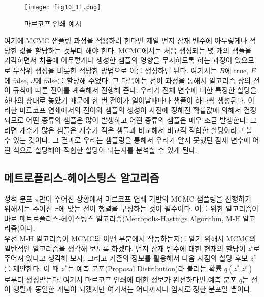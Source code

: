 \documentclass[a4paper]{oblivoir}
\begin{document}
\begin{figure}[ht] \centering 
\texttt{[image: fig10\_11.png]} 
\caption{마르코프 연쇄 예시}
\label{fig:10-11}
\end{figure}  

여기에 MCMC 샘플링 과정을 적용하려 한다면 제일 먼저 잠재 변수에 아무렇게나 적당한 값을 할당하는 것부터 해야 한다. MCMC에서는 처음 생성되는 몇 개의 샘플을 기각하면서 처음에 아무렇게나 생성한 샘플의 영향을 무시하도록 하는 과정이 있으므로 무작위 생성을 비롯한 적당한 방법으로 이를 생성하면 된다. 여기서는 $B$에 true, $E$에 false, $J$에 false를 할당해 주었다. 그 다음에는 전이 과정을 통해서 알고리즘 상의 전이 규칙에 따른 전이를 계속해서 진행해 준다. 우리가 전체 변수에 대한 특정한 할당을 하나의 상태로 놓았기 때문에 한 번 전이가 일어날때마다 샘플이 하나씩 생성된다. 이러한 마르코프 연쇄에서의 전이와 샘플의 생성이 사전에 정해진 확률값에 의해서 결정되므로 어떤 종류의 샘플은 많이 발생하고 어떤 종류의 샘플은 매우 조금 발생한다. 그러면 개수가 많은 샘플은 개수가 적은 샘플과 비교해서 비교적 적합한 할당이라고 볼 수 있는 것이다. 그 결과로 우리는 샘플링을 통해서 우리가 알지 못했던 잠재 변수에 어떤 식으로 할당해야 적합한 할당이 되는지를 분석할 수 있게 된다.\\

\subsection{메트로폴리스-헤이스팅스 알고리즘}

정적 분포 $\pi$만이 주어진 상황에서 마르코프 연쇄 기반의 MCMC 샘플링을 진행하기 위해서는 주어진 $\pi$에 맞는 전이 행렬을 구성하는 것이 필수이다. 이를 위한 알고리즘이 바로 메트로폴리스-헤이스팅스 알고리즘(Metropolis-Hastings Algorithm, M-H 알고리즘)이다. \\

우선 M-H 알고리즘이 MCMC의 어떤 부분에서 작동하는지를 알기 위해서 MCMC의 일반적인 알고리즘을 생각해 보도록 하겠다. 먼저 잠재 변수에 대한 현재의 할당이 $z^{t}$로 주어져 있다고 생각해 보자. 그리고  기존의 정보를 활용해서 다음 시점의 할당 후보 $z^{*}$를 제안한다. 이 때 $z^{*}$는 예측 분포(Proposal Distribution)라 불리는 확률 $q(z^{*}|z^{t})$로부터 생성받는다. 여기서 마르코프 연쇄에 대한 정보가 완전하다면 예측 분포 $q$는 전이 행렬과 동일한 개념이 되겠지만 여기서는 어디까지나 임시로 정한 분포일 뿐이다. \\
\end{document}
